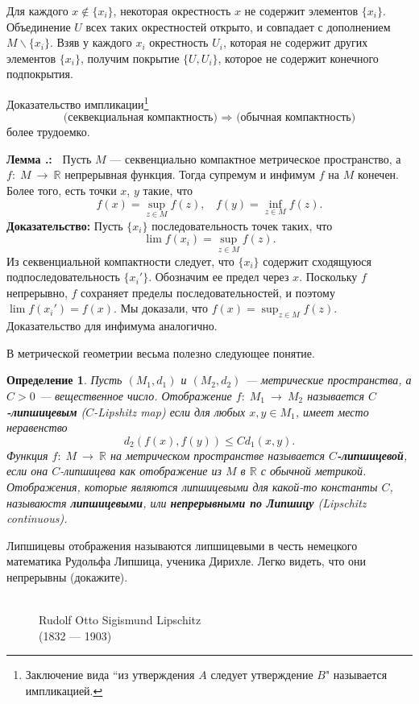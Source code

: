 \documentclass[12pt]{book}
\newcommand{\arrow}{{\:\longrightarrow\:}}
\def\endproof{\hbox{\vrule width 5pt height 5pt depth 0pt}}
\def\R{{\mathbb R}}
\theoremstyle{upshape}
\theoremstyle{generic}
\newtheorem{opredelenie}[teorema]{Определение}
\def\еза{\end{remark}}
\theoremstyle{upshapenonumber}
\newcommand{\следствие}{%
     \refstepcounter{teorema}
     {\noindent\bf Следствие \thechapter.\arabic{teorema}:\ }}
\newcommand{\пример}{%
     \refstepcounter{teorema}
     {\noindent\bf Пример \thechapter.\arabic{teorema}:\ }}
\newcommand{\лемма}{%
     \refstepcounter{teorema}
     {\noindent\bf Лемма \thechapter.\arabic{teorema}:\ }}
\newcommand{\теорема}{%
     \refstepcounter{teorema}
     {\noindent\bf Теорема \thechapter.\arabic{teorema}:\ }}
\newcommand{\утверждение}{%
     \refstepcounter{teorema}
     {\noindent\bf Утверждение \thechapter.\arabic{teorema}:\ }}
\def\хфилл{\hfill}
\def\бф{\bf}
\def\ем{\em}
\def\ез{\end{zadacha}}
\def\еу{\end{ukazanie}}
\def\определение{\begin{opredelenie}}
\def\ео{\end{opredelenie}}
\def\енум{\begin{enumerate}}
\def\ее{\end{enumerate}}
\begin{document}
Для каждого $x\notin \{x_i\}$,
некоторая окрестность $x$ не содержит элементов
$\{x_i\}$. Объединение $U$ всех таких окрестностей 
открыто, и совпадает с дополнением $M \backslash \{ x_i\}$.
Взяв у каждого $x_i$ окрестность $U_i$, которая не содержит
других элементов $\{x_i\}$, получим покрытие
$\{U, U_i\}$, которое не содержит конечного подпокрытия.

Доказательство импликации\footnote{Заключение вида ``из утверждения
$A$ следует утверждение $B$" называется импликацией.}
\[\text{
(секвекциальная компактность) $\Rightarrow$ (обычная компактность)}
\]
более трудоемко. 


\хфилл

\лемма
Пусть $M$ --- секвенциально компактное метрическое пространство,
а $f:\; M \arrow \R$ непрерывная функция. Тогда супремум
и инфимум $f$ на $M$ конечен. Более того, есть точки
$x$, $y$ такие, что
\[
f(x) = \sup_{z\in M} f(z), \ \ \ \ f(y) = \inf_{z\in M} f(z).
\]
{\bf Доказательство:} Пусть $\{x_i\}$ последовательность
точек таких, что 
\[
\lim f(x_i) = \sup_{z\in M} f(z).
\]
Из секвенциальной компактности следует, что $\{x_i\}$ 
содержит сходящуюся подпоследовательность $\{x_i'\}$. Обозначим
ее предел через $x$. Поскольку $f$ непрерывно, $f$ сохраняет 
пределы последовательностей, и поэтому $\lim f(x_i')= f(x)$.
Мы доказали, что $f(x)= \sup_{z\in M} f(z)$.
Доказательство для инфимума аналогично.
\endproof

\хфилл

В метрической геометрии весьма полезно следующее понятие.

\определение 
Пусть $(M_1, d_1)$ и $(M_2, d_2)$ --- метрические
пространства, а $C>0$ --- вещественное число. 
Отображение $f:\; M_1 \arrow M_2$ называется {\бф
$C$-липшицевым} ($C$-Lipshitz map) если для любых
$x, y\in M_1$, имеет место неравенство
\[
d_2(f(x),f(y)) \leq C d_1 (x, y).
\]
Функция $f:\; M \arrow \R$
на метрическом пространстве называется
{\bf $C$-липшицевой}, если она $C$-липшицева как отображение
из $M$ в $\R$ с обычной метрикой.
Отображения, которые являются липшицевыми
для ка\-кой-\-то константы $C$, называюстя
{\бф липшицевыми}, или {\бф непрерывными
по Липшицу} (Lipschitz continuous).
\ео

Липшицевы отображения называются липшицевыми в честь
немецкого математика Рудольфа Липшица, ученика Дирихле. 
Легко видеть, что они непрерывны (докажите).


\begin{figure}[ht]
\begin{center}
\\
Rudolf Otto Sigismund Lipschitz \\
(1832 --- 1903)
\end{center}
\end{figure}
\end{document}
